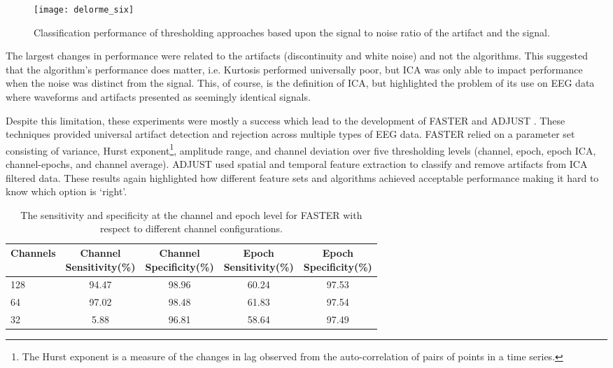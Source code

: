 \begin{figure}[ht]
\centering
\texttt{[image: delorme\_six]}
\caption[Statistical Thresholding of Artifacts]{Classification performance of thresholding approaches based upon the signal to noise ratio of the artifact and the signal.}
\label{fig:delorme_six}
\end{figure}

The largest changes in performance were related to the artifacts (discontinuity and white noise) and not the algorithms. This suggested that the algorithm's performance does matter, i.e. Kurtosis performed universally poor, but \ac{ICA} was only able to impact performance when the noise was distinct from the signal. This, of course, is the definition of \ac{ICA}, but highlighted the problem of its use on \ac{EEG} data where waveforms and artifacts presented as seemingly identical signals.

Despite this limitation, these experiments were mostly a success which lead to the development of \ac{FASTER} \cite{Nolan2010} and \ac{ADJUST} \cite{Mognon2011}. These techniques provided universal artifact detection and rejection across multiple types of \ac{EEG} data. \ac{FASTER} relied on a parameter set consisting of variance, Hurst exponent\footnote{The Hurst exponent is a measure of the changes in lag observed from the auto-correlation of pairs of points in a time series.}, amplitude range, and channel deviation over five thresholding levels (channel, epoch, epoch \ac{ICA}, channel-epochs, and channel average). \ac{ADJUST} used spatial and temporal feature extraction to classify and remove artifacts  from \ac{ICA} filtered data. These results again highlighted how different feature sets and algorithms achieved acceptable performance making it hard to know which option is `right'.

\begin{table}[ht]
\centering
\caption[FASTER's artifact detection performance]{The sensitivity and specificity at the channel and epoch level for FASTER with respect to different channel configurations.}
\begin{tabular}{l c c c c}
\toprule
Channels & \makecell{Channel\\Sensitivity(\%)} & \makecell{Channel\\Specificity(\%)} & \makecell{Epoch\\Sensitivity(\%)} & \makecell{Epoch\\Specificity(\%)} \\
\midrule
128 & 94.47 & 98.96 & 60.24 & 97.53 \\
64 & 97.02 & 98.48 & 61.83 & 97.54 \\
32 & 5.88 & 96.81 & 58.64 & 97.49 \\
\bottomrule 
\end{tabular}
\label{tab:nolan}
\end{table}

